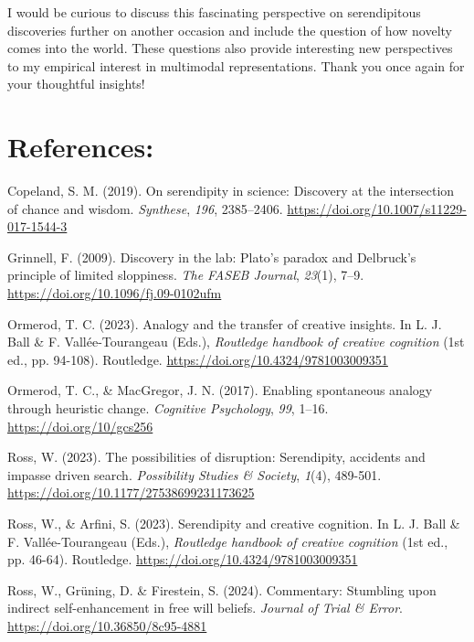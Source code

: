 \documentclass[authordate, commentary]{jote-new-article}
\begin{document}
	I would be curious to discuss this fascinating perspective on serendipitous discoveries further on another occasion and include the question of how novelty comes into the world. These questions also provide interesting new perspectives to my empirical interest in multimodal representations. Thank you once again for your thoughtful insights!



	\section{References:}



	Copeland, S. M. (2019). On serendipity in science: Discovery at the intersection of chance and wisdom. \emph{Synthese}, \emph{196}, 2385--2406. \url{https://doi.org/10.1007/s11229-017-1544-3}



	Grinnell, F. (2009). Discovery in the lab: Plato's paradox and Delbruck's principle of limited sloppiness. \emph{The FASEB Journal}, \emph{23}(1), 7--9. \url{https://doi.org/10.1096/fj.09-0102ufm}



	Ormerod, T. C. (2023). Analogy and the transfer of creative insights. In L. J. Ball \& F. Vallée-Tourangeau (Eds.), \emph{Routledge handbook of creative cognition }(1st ed., pp. 94-108). Routledge. \url{https://doi.org/10.4324/9781003009351}



	Ormerod, T. C., \& MacGregor, J. N. (2017). Enabling spontaneous analogy through heuristic change. \emph{Cognitive Psychology}, \emph{99}, 1--16. \url{https://doi.org/10/gcs256}



	Ross, W. (2023). The possibilities of disruption: Serendipity, accidents and impasse driven search. \emph{Possibility Studies \& Society}, \emph{1}(4), 489-501. \url{https://doi.org/10.1177/27538699231173625}

	Ross, W., \& Arfini, S. (2023). Serendipity and creative cognition. In L. J. Ball \& F. Vallée-Tourangeau (Eds.), \emph{Routledge handbook of creative cognition }(1st ed., pp. 46-64). Routledge. \url{https://doi.org/10.4324/9781003009351}



	Ross, W., Grüning, D. \& Firestein, S. (2024). Commentary: Stumbling upon indirect self-enhancement in free will beliefs. \emph{Journal of Trial \& Error}. \url{https://doi.org/10.36850/8c95-4881}
\end{document}
